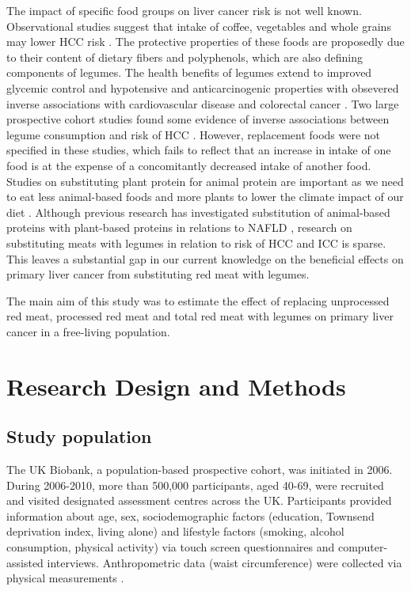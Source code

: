 \documentclass[nutrients,article,submit,moreauthors,pdftex]{Definitions/mdpi}
\begin{document}
The impact of specific food groups on liver cancer risk is not well
known. Observational studies suggest that intake of coffee, vegetables
and whole grains may lower HCC risk
\citep{zhang2013, yang2014, Liu2021, Bhurwal2020}. The protective
properties of these foods are proposedly due to their content of dietary
fibers and polyphenols, which are also defining components of legumes.
The health benefits of legumes extend to improved glycemic control and
hypotensive and anticarcinogenic properties with obsevered inverse
associations with cardiovascular disease and colorectal cancer
\citep{viguiliouk2019, jin2022}. Two large prospective cohort studies
found some evidence of inverse associations between legume consumption
and risk of HCC \citep{zhang2013, Liu2021}. However, replacement foods
were not specified in these studies, which fails to reflect that an
increase in intake of one food is at the expense of a concomitantly
decreased intake of another food. Studies on substituting plant protein
for animal protein are important as we need to eat less animal-based
foods and more plants to lower the climate impact of our diet
\citep{RN71}. Although previous research has investigated substitution
of animal-based proteins with plant-based proteins in relations to NAFLD
\citep{Zhang2023}, research on substituting meats with legumes in
relation to risk of HCC and ICC is sparse. This leaves a substantial gap
in our current knowledge on the beneficial effects on primary liver
cancer from substituting red meat with legumes.

The main aim of this study was to estimate the effect of replacing
unprocessed red meat, processed red meat and total red meat with legumes
on primary liver cancer in a free-living population.

\hypertarget{sec2}{%
\section{Research Design and Methods}\label{sec2}}

\hypertarget{subsec1}{%
\subsection{Study population}\label{subsec1}}

The UK Biobank, a population-based prospective cohort, was initiated in
2006. \citep{sudlow2015} During 2006-2010, more than 500,000
participants, aged 40-69, were recruited and visited designated
assessment centres across the UK. Participants provided information
about age, sex, sociodemographic factors (education, Townsend
deprivation index, living alone) and lifestyle factors (smoking, alcohol
consumption, physical activity) via touch screen questionnaires and
computer-assisted interviews. Anthropometric data (waist circumference)
were collected via physical measurements \citep{RN113}.
\end{document}

